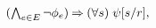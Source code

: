 \begin{minipage}{1.0\linewidth}
\begin{minipage}[t]{.45\textwidth}
\begin{enumerate}[topsep=0pt,label=(\textsc{r}\arabic*),ref=\textsc{r}\arabic*]
\begin{math}
\begin{aligned}[t]
          \textstyle (\bigwedge_{e\in E}\lnot\phi_e)
          \mathbin{\Rightarrow} 
          (\forall s)\;
          \psi[s/r],
        \end{aligned}
      \end{math}
  \end{enumerate}
\end{minipage}
\begin{minipage}[t]{.55\textwidth}
  \begin{enumerate}[topsep=0pt,label=(\textsc{r}\arabic*),ref=\textsc{r}\arabic*]

\end{enumerate}
\end{minipage}
\end{minipage}
